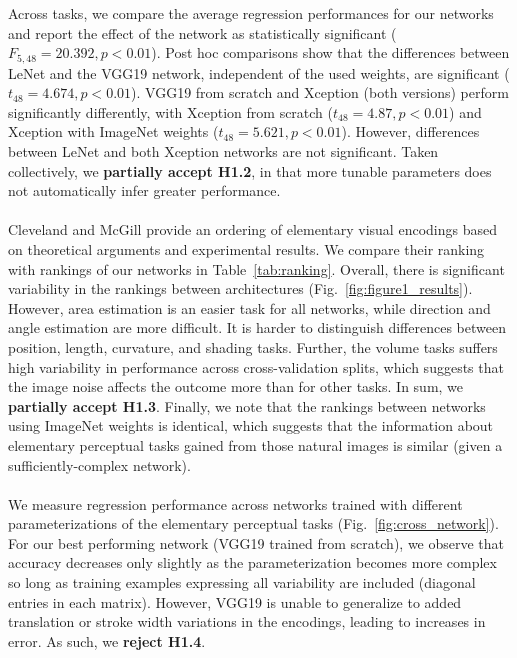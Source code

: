 Across tasks, we compare the average regression performances for our networks and report the effect of the network as statistically significant ($F_{5,48}=20.392,p<0.01$). Post hoc comparisons show that the differences between LeNet and the VGG19 network, independent of the used weights, are significant ($t_48=4.674,p<0.01$). VGG19 from scratch and Xception (both versions) perform significantly differently, with Xception from scratch ($t_48=4.87,p<0.01$) and Xception with ImageNet weights ($t_48=5.621,p<0.01$). However, differences between LeNet and both Xception networks are not significant. Taken collectively, we \textbf{partially accept H1.2}, in that more tunable parameters does not automatically infer greater performance.
\\~\\
 Cleveland and McGill provide an ordering of elementary visual encodings based on theoretical arguments and experimental results. We compare their ranking with rankings of our networks in Table~\ref{tab:ranking}. Overall, there is significant variability in the rankings between architectures (Fig.~\ref{fig:figure1_results}). However, area estimation is an easier task for all networks, while direction and angle estimation are more difficult. It is harder to distinguish differences between position, length, curvature, and shading tasks. Further, the volume tasks suffers high variability in performance across cross-validation splits, which suggests that the image noise affects the outcome more than for other tasks. In sum, we \textbf{partially accept H1.3}. Finally, we note that the rankings between networks using ImageNet weights is identical, which suggests that the information about elementary perceptual tasks gained from those natural images is similar (given a sufficiently-complex network).
\\~\\
 We measure regression performance across networks trained with different parameterizations of the elementary perceptual tasks (Fig.~\ref{fig:cross_network}). For our best performing network (VGG19 trained from scratch), we observe that accuracy decreases only slightly as the parameterization becomes more complex so long as training examples expressing all variability are included (diagonal entries in each matrix).  However, VGG19 is unable to generalize to added translation or stroke width variations in the encodings, leading to increases in error. As such, we \textbf{reject H1.4}. 

